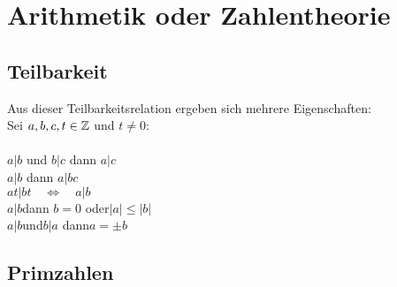 \chapter{Arithmetik oder Zahlentheorie}

	\section{Teilbarkeit}


Aus dieser Teilbarkeitsrelation ergeben sich mehrere Eigenschaften:\\
Sei $a,b,c,t\in\mathbb{Z}$ und $t$:\\\\
$a|b$ \quad und \quad$b|c$ \quad dann \quad $a|c$\\
$a|b$ \quad dann \quad $a|bc$\\
$at|bt\quad\Leftrightarrow\quad a|b$\\
$a|b$\quad dann \quad $b=0$ \quad oder\quad $|a| \leq |b| $\\
$a|b$\quad und\quad $b|a$ \quad dann\quad $a=\pm b$

	\section{Primzahlen}

